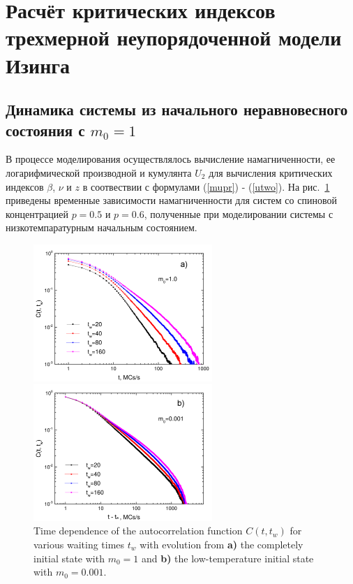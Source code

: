\documentclass[12pt,a4paper]{article}
\begin{document}
\section[Критические индексы]{Расчёт критических индексов трехмерной неупорядоченной модели Изинга}

\subsection{Динамика системы из начального неравновесного состояния с $m_0 = 1$}
В процессе моделирования осуществлялось вычисление намагниченности, ее логарифмической производной и кумулянта $U_2$ для вычисления критических индексов $\beta$, $\nu$ и $z$ в соотвествии с формулами (\ref{mupr}) - (\ref{utwo}). На рис.~\ref{fig:m1_all} приведены временные зависимости намагниченности для систем со спиновой концентрацией $p = 0.5$ и $p = 0.6$, полученные при моделировании системы с низкотемпаратурным начальным состоянием.

\begin{figure}[h]
\begin{center}

\begin{minipage}{6.77cm}
\includegraphics[width=6.77cm]{corr_ageing_1}
\end{minipage}\hspace{0.85cm}%
\begin{minipage}{6.77cm}
\includegraphics[width=6.77cm]{corr_ageing_0001}
\end{minipage}

\caption{\label{fig:m1_all} Time dependence of the autocorrelation
function $C(t, t_w)$ for various waiting times $t_w$ with evolution
from \textbf{a)} the completely initial state with $m_0 = 1$ and
\textbf{b)} the low-temperature initial state with $m_0 = 0.001$.}

\end{center}
\end{figure}
\end{document}

